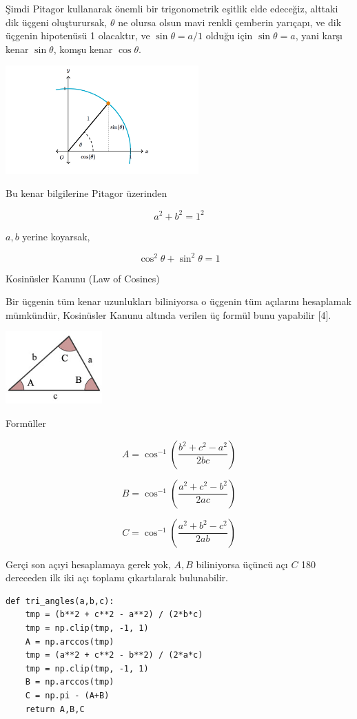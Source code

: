\documentclass[12pt,fleqn]{article}\usepackage{../../common}
\begin{document}
Şimdi Pitagor kullanarak önemli bir trigonometrik eşitlik elde edeceğiz, alttaki
dik üçgeni oluşturursak, $\theta$ ne olursa olsun mavi renkli çemberin yarıçapı,
ve dik üçgenin hipotenüsü 1 olacaktır, ve $\sin\theta = a / 1$ olduğu için
$\sin\theta = a$, yani karşı kenar $\sin\theta$, komşu kenar $\cos\theta$.

\includegraphics[width=20em]{ode_mattuck_50_trig_02.png}

Bu kenar bilgilerine Pitagor üzerinden

$$
a^2 + b^2 = 1^2 
$$

$a,b$ yerine koyarsak,

$$
\cos^2\theta + \sin^2\theta = 1
$$

Kosinüsler Kanunu (Law of Cosines)

Bir üçgenin tüm kenar uzunlukları biliniyorsa o üçgenin tüm açılarını
hesaplamak mümkündür, Kosinüsler Kanunu altında verilen üç formül
bunu yapabilir [4].

\includegraphics[width=10em]{triangle-base.jpg}

Formüller

$$
A = \cos^{-1} \left( \frac{b^2 + c^2 - a^2}{2bc}  \right)
$$

$$
B = \cos^{-1} \left( \frac{a^2 + c^2 - b^2}{2ac}  \right)
$$

$$
C = \cos^{-1} \left( \frac{a^2 + b^2 - c^2}{2ab}  \right)
$$

Gerçi son açıyi hesaplamaya gerek yok, $A,B$ biliniyorsa üçüncü açı $C$ 180
dereceden ilk iki açı toplamı çıkartılarak bulunabilir.

\begin{verbatim}
def tri_angles(a,b,c):
    tmp = (b**2 + c**2 - a**2) / (2*b*c)
    tmp = np.clip(tmp, -1, 1)
    A = np.arccos(tmp)
    tmp = (a**2 + c**2 - b**2) / (2*a*c)
    tmp = np.clip(tmp, -1, 1)
    B = np.arccos(tmp)
    C = np.pi - (A+B)
    return A,B,C
\end{verbatim}
\end{document}
